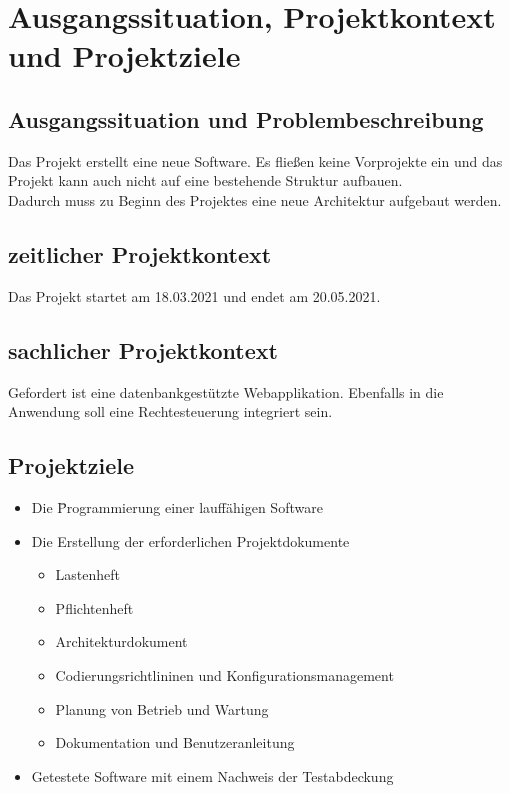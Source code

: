 
\chapter{Ausgangssituation, Projektkontext und Projektziele}
\section{Ausgangssituation und Problembeschreibung}
Das Projekt erstellt eine neue Software. Es fließen keine Vorprojekte ein und das Projekt kann auch nicht auf eine bestehende Struktur aufbauen. \\
Dadurch muss zu Beginn des Projektes eine neue Architektur aufgebaut werden. \\
\section{zeitlicher Projektkontext}
Das Projekt startet am 18.03.2021 und endet am 20.05.2021.
\section{sachlicher Projektkontext}
Gefordert ist eine datenbankgestützte Webapplikation. Ebenfalls in die Anwendung soll eine Rechtesteuerung integriert sein.
\section{Projektziele}
\begin{itemize}
\item Die \= Programmierung einer lauffähigen Software 
\item Die Erstellung der erforderlichen Projektdokumente
	\begin{itemize}
	\item Lastenheft
	\item Pflichtenheft
	\item Architekturdokument
	\item Codierungsrichtlininen und Konfigurationsmanagement
	\item Planung von Betrieb und Wartung
	\item Dokumentation und Benutzeranleitung
	\end{itemize}
\item Getestete Software mit einem Nachweis der Testabdeckung
\end{itemize}



